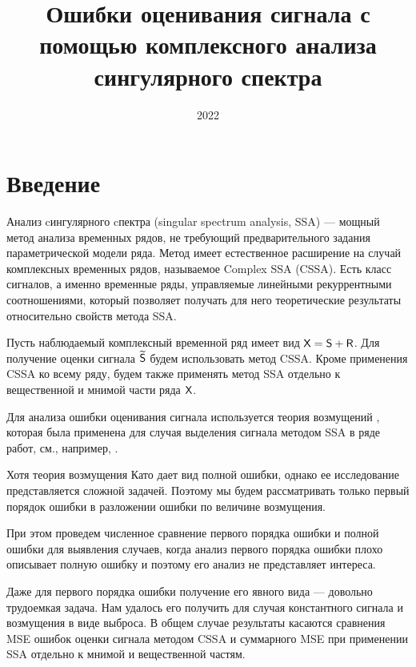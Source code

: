 \documentclass[12pt,a4paper]{article}
\title{Ошибки оценивания сигнала с помощью комплексного анализа сингулярного спектра
}
\date{2022}
\begin{document}
\maketitle

\section{Введение}
Анализ cингулярного cпектра (singular spectrum analysis, SSA)  \cite{Golyandina.etal2001}
 --- мощный метод анализа временных
рядов, не требующий предварительного задания параметрической модели ряда. Метод имеет естественное расширение на случай комплексных временных рядов, называемое Complex SSA (CSSA).
Есть класс сигналов, а именно временные ряды, управляемые линейными рекуррентными соотношениями, который позволяет получать для него теоретические результаты относительно свойств метода SSA.

Пусть наблюдаемый комплексный временной ряд имеет вид $\textsf{X} =\textsf{S} + \textsf{R}$. Для получение оценки сигнала $\widetilde{\textsf{S}}$ будем использовать метод CSSA. Кроме применения CSSA ко всему ряду, будем также применять метод SSA отдельно к вещественной и мнимой части ряда $\textsf{X}$.

Для анализа ошибки оценивания сигнала используется теория возмущений \cite{Kato}, которая была применена для случая выделения сигнала методом SSA в ряде работ, см., например, \cite{Nekrutkin}.

Хотя теория возмущения Като дает вид полной ошибки, однако ее исследование представляется сложной задачей. Поэтому мы будем рассматривать только первый порядок ошибки в разложении ошибки по величине возмущения.

При этом проведем численное сравнение первого порядка ошибки и полной ошибки для выявления случаев, когда анализ первого порядка ошибки плохо описывает полную ошибку и поэтому его анализ не представляет интереса.

Даже для первого порядка ошибки получение его явного вида --- довольно трудоемкая задача. Нам удалось его получить для случая константного сигнала и возмущения в виде выброса. В общем случае результаты касаются сравнения MSE ошибок оценки сигнала методом CSSA и суммарного MSE при применении SSA отдельно к мнимой и вещественной частям.


\end{document}
